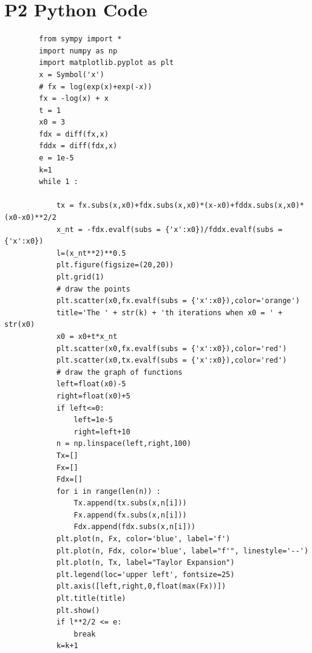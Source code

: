 \documentclass{article}
\theoremstyle{definition}
\theoremstyle{definition}
\theoremstyle{remark}
\begin{document}
\section*{P2 Python Code}
    \begin{verbatim}
        from sympy import *
        import numpy as np
        import matplotlib.pyplot as plt
        x = Symbol('x')
        # fx = log(exp(x)+exp(-x))
        fx = -log(x) + x
        t = 1
        x0 = 3
        fdx = diff(fx,x)
        fddx = diff(fdx,x)
        e = 1e-5
        k=1
        while 1 :
        
            tx = fx.subs(x,x0)+fdx.subs(x,x0)*(x-x0)+fddx.subs(x,x0)*(x0-x0)**2/2
            x_nt = -fdx.evalf(subs = {'x':x0})/fddx.evalf(subs = {'x':x0})
            l=(x_nt**2)**0.5
            plt.figure(figsize=(20,20))
            plt.grid(1)
            # draw the points
            plt.scatter(x0,fx.evalf(subs = {'x':x0}),color='orange')
            title='The ' + str(k) + 'th iterations when x0 = ' + str(x0)
            x0 = x0+t*x_nt
            plt.scatter(x0,fx.evalf(subs = {'x':x0}),color='red')
            plt.scatter(x0,tx.evalf(subs = {'x':x0}),color='red')
            # draw the graph of functions
            left=float(x0)-5
            right=float(x0)+5
            if left<=0:
                left=1e-5
                right=left+10
            n = np.linspace(left,right,100)
            Tx=[]
            Fx=[]
            Fdx=[]
            for i in range(len(n)) :
                Tx.append(tx.subs(x,n[i]))
                Fx.append(fx.subs(x,n[i]))
                Fdx.append(fdx.subs(x,n[i]))
            plt.plot(n, Fx, color='blue', label='f')
            plt.plot(n, Fdx, color='blue', label="f'", linestyle='--')
            plt.plot(n, Tx, label="Taylor Expansion")
            plt.legend(loc='upper left', fontsize=25) 
            plt.axis([left,right,0,float(max(Fx))])
            plt.title(title)
            plt.show()
            if l**2/2 <= e:
                break
            k=k+1

    \end{verbatim}
\end{document}
